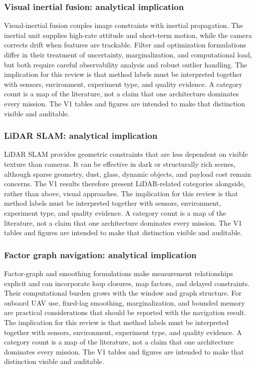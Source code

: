 \documentclass[
  journal,
  10pt]{IEEEtran}
\begin{document}
\subsubsection{Visual inertial fusion: analytical
implication}\label{visual-inertial-fusion-analytical-implication-1}

Visual-inertial fusion couples image constraints with inertial
propagation. The inertial unit supplies high-rate attitude and
short-term motion, while the camera corrects drift when features are
trackable. Filter and optimization formulations differ in their
treatment of uncertainty, marginalization, and computational load, but
both require careful observability analysis and robust outlier handling.
The implication for this review is that method labels must be
interpreted together with sensors, environment, experiment type, and
quality evidence. A category count is a map of the literature, not a
claim that one architecture dominates every mission. The V1 tables and
figures are intended to make that distinction visible and auditable.

\subsubsection{LiDAR SLAM: analytical
implication}\label{lidar-slam-analytical-implication-1}

LiDAR SLAM provides geometric constraints that are less dependent on
visible texture than cameras. It can be effective in dark or
structurally rich scenes, although sparse geometry, dust, glass, dynamic
objects, and payload cost remain concerns. The V1 results therefore
present LiDAR-related categories alongside, rather than above, visual
approaches. The implication for this review is that method labels must
be interpreted together with sensors, environment, experiment type, and
quality evidence. A category count is a map of the literature, not a
claim that one architecture dominates every mission. The V1 tables and
figures are intended to make that distinction visible and auditable.

\subsubsection{Factor graph navigation: analytical
implication}\label{factor-graph-navigation-analytical-implication-1}

Factor-graph and smoothing formulations make measurement relationships
explicit and can incorporate loop closures, map factors, and delayed
constraints. Their computational burden grows with the window and graph
structure. For onboard UAV use, fixed-lag smoothing, marginalization,
and bounded memory are practical considerations that should be reported
with the navigation result. The implication for this review is that
method labels must be interpreted together with sensors, environment,
experiment type, and quality evidence. A category count is a map of the
literature, not a claim that one architecture dominates every mission.
The V1 tables and figures are intended to make that distinction visible
and auditable.
\end{document}
